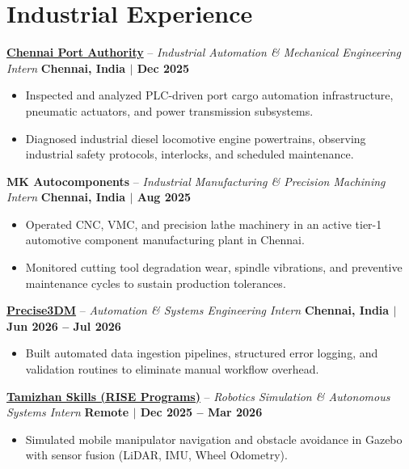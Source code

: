 \documentclass[letterpaper,10pt]{article}
\begin{document}
\section{Industrial Experience}
\noindent
\href{https://chennaiport.gov.in}{\textbf{Chennai Port Authority}} -- \textit{Industrial Automation \& Mechanical Engineering Intern} \hfill \textbf{Chennai, India $|$ Dec 2025} \\
\begin{itemize}
    \item Inspected and analyzed PLC-driven port cargo automation infrastructure, pneumatic actuators, and power transmission subsystems.
    \item Diagnosed industrial diesel locomotive engine powertrains, observing industrial safety protocols, interlocks, and scheduled maintenance.
\end{itemize}
\vspace{2pt}

\noindent
\textbf{MK Autocomponents} -- \textit{Industrial Manufacturing \& Precision Machining Intern} \hfill \textbf{Chennai, India $|$ Aug 2025} \\
\begin{itemize}
    \item Operated CNC, VMC, and precision lathe machinery in an active tier-1 automotive component manufacturing plant in Chennai.
    \item Monitored cutting tool degradation wear, spindle vibrations, and preventive maintenance cycles to sustain production tolerances.
\end{itemize}
\vspace{2pt}

\noindent
\href{https://precise3dm.com}{\textbf{Precise3DM}} -- \textit{Automation \& Systems Engineering Intern} \hfill \textbf{Chennai, India $|$ Jun 2026 -- Jul 2026} \\
\begin{itemize}
    \item Built automated data ingestion pipelines, structured error logging, and validation routines to eliminate manual workflow overhead.
\end{itemize}
\vspace{2pt}

\noindent
\href{https://tamizhanskill.com}{\textbf{Tamizhan Skills (RISE Programs)}} -- \textit{Robotics Simulation \& Autonomous Systems Intern} \hfill \textbf{Remote $|$ Dec 2025 -- Mar 2026} \\
\begin{itemize}
    \item Simulated mobile manipulator navigation and obstacle avoidance in Gazebo with sensor fusion (LiDAR, IMU, Wheel Odometry).
\end{itemize}
\end{document}
